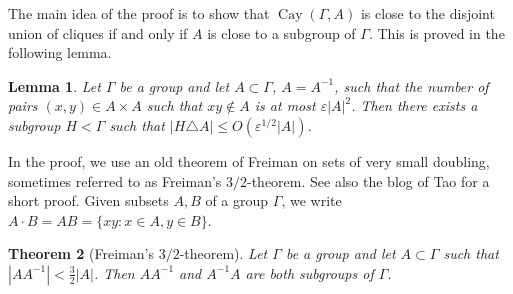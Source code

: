 \documentclass[11pt]{article}
\theoremstyle{plain}
\newtheorem{theorem}{Theorem}[section]
\newtheorem{lemma}[theorem]{Lemma}
\theoremstyle{definition}
\newcommand{\eps}{\varepsilon}
\DeclareMathOperator{\Cay}{Cay}
\begin{document}
The main idea of the proof is to show that $\Cay(\Gamma,A)$ is close to the disjoint union of cliques if and only if $A$ is close to a subgroup of $\Gamma$. This is proved in the following lemma.

\begin{lemma}\label{lemma:chowla_stability}
Let $\Gamma$ be a group and let $A\subset \Gamma$, $A=A^{-1}$, such that the number of pairs $(x,y)\in A\times A$ such that $xy\not\in A$ is at most $\eps |A|^2$. Then there exists a subgroup $H<\Gamma$ such that $|H\triangle A|\leq O(\eps^{1/2} |A|)$.
\end{lemma}

In the proof, we use an old theorem of Freiman \cite{freiman} on sets of very small doubling, sometimes referred to as Freiman's $3/2$-theorem. See also the blog of Tao \cite{tao} for a short proof. Given subsets $A,B$ of a group $\Gamma$, we write $A\cdot B=AB=\{xy: x\in A, y\in B\}$.

\begin{theorem}[Freiman's $3/2$-theorem]\label{thm:chowla_3/2}
Let $\Gamma$ be a group and let $A\subset \Gamma$ such that $|AA^{-1}|< \frac{3}{2}|A|$. Then $A A^{-1}$ and $A^{-1} A$ are both subgroups of $\Gamma$.
\end{theorem}
\end{document}
